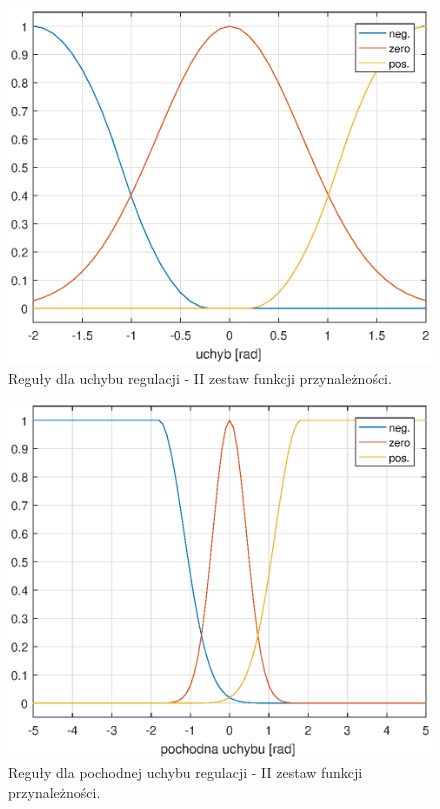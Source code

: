 \begin{figure}[h!]
	\centering
	\includegraphics[scale = 0.6]{fig/e_rules2.eps}
	\caption		
	{Reguły dla uchybu regulacji -  II zestaw funkcji przynależności.}
	\label{e_rules2}
\end{figure}


\begin{figure}[h!]
	\centering
	\includegraphics[scale = 0.6]{fig/de_rules2.eps}
	\caption		
	{Reguły dla pochodnej uchybu regulacji -  II zestaw funkcji przynależności.}
	\label{de_rules2}
\end{figure}


